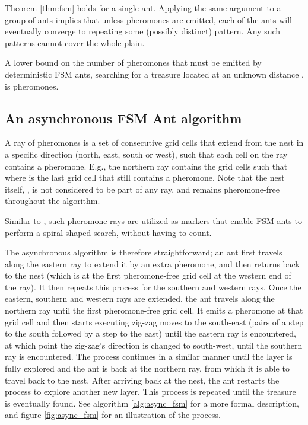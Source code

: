 \begin{observation}
Theorem \ref{thm:fsm} holds for a single ant. Applying the same argument to a group of 
ants implies that unless  pheromones are emitted, each of the  ants will
eventually converge to repeating some (possibly distinct) pattern. 
Any  such patterns cannot cover the whole plain.
\end{observation}

\begin{corollary}
A lower bound on the number of pheromones that must be emitted by  deterministic
FSM ants, searching for a treasure located at an unknown distance , 
is  pheromones.
\end{corollary}

\subsection{An asynchronous FSM Ant algorithm}

\begin{definition}[Ray]
A ray of pheromones is a set of consecutive grid cells that extend from the nest in a specific
direction (north, east, south or west), such that each cell on the ray contains a pheromone. 
E.g., the northern ray contains the grid cells  such that
 where  is the last grid cell that still contains a pheromone.
Note that the nest itself, , is not considered to be part of any ray, and remains 
pheromone-free throughout the algorithm.

Similar to \cite{Emek2013FSM}, such pheromone rays are utilized as markers that enable FSM ants to perform a spiral
 shaped search, without having to count. 
\end{definition}

The asynchronous algorithm is therefore straightforward; an ant first travels along the eastern ray to
extend it by an extra pheromone, and then returns back to the nest (which is at the first
pheromone-free grid cell at the western end of the ray). 
It then repeats this process for the southern and western rays.
 Once the eastern, southern and western rays are extended, the ant travels along
the northern ray until the first pheromone-free grid cell. It emits a pheromone at that grid
cell and then starts executing zig-zag moves to the south-east (pairs of a step to the south
followed by a step to the east) until the eastern ray is encountered, at which point the
zig-zag's direction is changed to south-west, until the southern ray is encountered.
The process continues in a similar manner until the layer is fully explored and the
 ant is back at the northern ray, from
which it is able to travel back to the nest. After arriving back at the nest, the ant restarts the
process to explore another new layer. This process is repeated until the treasure is
 eventually found. See algorithm \ref{alg:async_fsm} for a more formal description, and
figure \ref{fig:async_fsm} for an illustration of the process.

